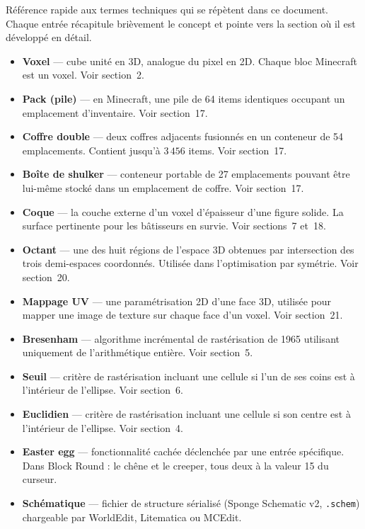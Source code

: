 \documentclass[12pt,a4paper]{scrartcl}
\newcommand{\code}[1]{\texttt{\small #1}}
\begin{document}
Référence rapide aux termes techniques qui se répètent dans ce document. Chaque entrée récapitule brièvement le concept et pointe vers la section où il est développé en détail.

\begin{itemize}[leftmargin=1.4em,itemsep=0.18em,topsep=0.3em]
  \item \textbf{Voxel} --- cube unité en 3D, analogue du pixel en 2D. Chaque bloc Minecraft est un voxel. Voir section~2.
  \item \textbf{Pack (pile)} --- en Minecraft, une pile de 64 items identiques occupant un emplacement d'inventaire. Voir section~17.
  \item \textbf{Coffre double} --- deux coffres adjacents fusionnés en un conteneur de 54 emplacements. Contient jusqu'à $3\,456$ items. Voir section~17.
  \item \textbf{Boîte de shulker} --- conteneur portable de 27 emplacements pouvant être lui-même stocké dans un emplacement de coffre. Voir section~17.
  \item \textbf{Coque} --- la couche externe d'un voxel d'épaisseur d'une figure solide. La surface pertinente pour les bâtisseurs en survie. Voir sections~7 et~18.
  \item \textbf{Octant} --- une des huit régions de l'espace 3D obtenues par intersection des trois demi-espaces coordonnés. Utilisée dans l'optimisation par symétrie. Voir section~20.
  \item \textbf{Mappage UV} --- une paramétrisation 2D d'une face 3D, utilisée pour mapper une image de texture sur chaque face d'un voxel. Voir section~21.
  \item \textbf{Bresenham} --- algorithme incrémental de rastérisation de 1965 utilisant uniquement de l'arithmétique entière. Voir section~5.
  \item \textbf{Seuil} --- critère de rastérisation incluant une cellule si l'un de ses coins est à l'intérieur de l'ellipse. Voir section~6.
  \item \textbf{Euclidien} --- critère de rastérisation incluant une cellule si son centre est à l'intérieur de l'ellipse. Voir section~4.
  \item \textbf{Easter egg} --- fonctionnalité cachée déclenchée par une entrée spécifique. Dans Block Round : le chêne et le creeper, tous deux à la valeur 15 du curseur.
  \item \textbf{Schématique} --- fichier de structure sérialisé (Sponge Schematic v2, \code{.schem}) chargeable par WorldEdit, Litematica ou MCEdit.
\end{itemize}
\end{document}
